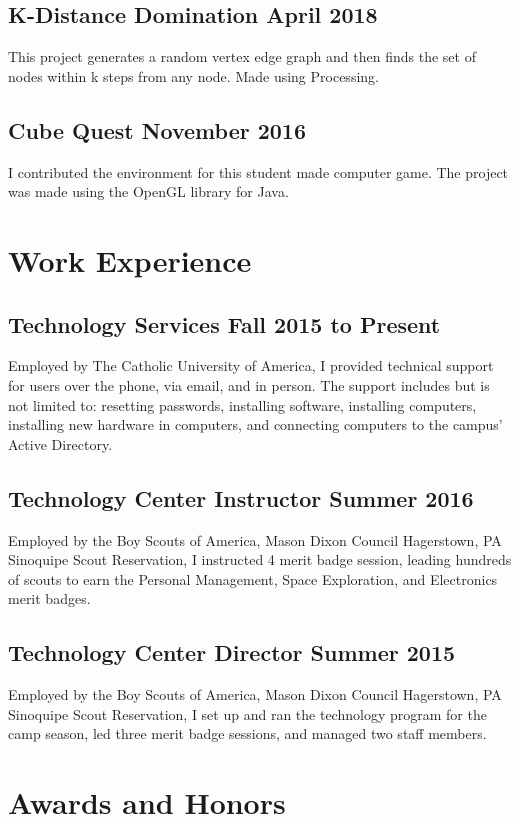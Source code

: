 \documentclass{article}
\begin{document}
\subsection{K-Distance Domination \hfill April 2018}
This project generates a random vertex edge graph and then finds the set of nodes within k steps from any node.
Made using Processing.

\subsection{Cube Quest \hfill November 2016}
I contributed the environment for this student made computer game.
The project was made using the OpenGL library for Java.


\section{Work Experience}
\subsection{Technology Services \hfill Fall 2015 to Present}
Employed by The Catholic University of America,
I provided technical support for users over the phone, via email, and in person.
The support includes but is not limited to:
resetting passwords,
installing software,
installing computers,
installing new hardware in computers,
and
connecting computers to the campus' Active Directory.

\subsection{Technology Center Instructor \hfill Summer 2016}
Employed by the Boy Scouts of America, Mason Dixon Council Hagerstown, PA Sinoquipe Scout Reservation,
I instructed 4 merit badge session, leading hundreds of scouts to earn the
Personal Management,
Space Exploration,
and
Electronics
merit badges.
\subsection{Technology Center Director \hfill Summer 2015}
Employed by the Boy Scouts of America, Mason Dixon Council Hagerstown, PA Sinoquipe Scout Reservation,
I set up and ran the technology program for the camp season,
led three merit badge sessions,
and managed two staff members.
\section{Awards and Honors}
\end{document}
